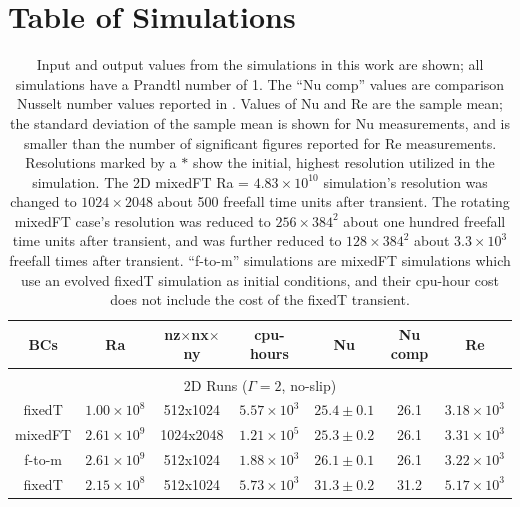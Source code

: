 \documentclass[aps, pre, onecolumn, nofootinbib, notitlepage, groupedaddress, amsfonts, amssymb, amsmath, longbibliography]{revtex4-1}
\begin{document}


\appendix
\section{Table of Simulations}
\label{app:table}


\begin{table}[ht]
\caption{
	Input and output values from the simulations in this work are shown; all simulations have a Prandtl number of 1.
	The ``Nu comp'' values are comparison Nusselt number values reported in \cite{zhu&all2018}.
	Values of Nu and Re are the sample mean; the standard deviation of the sample mean is shown for Nu measurements, and is smaller than the number of significant figures reported for Re measurements.
	Resolutions marked by a $*$ show the initial, highest resolution utilized in the simulation.
	The 2D mixedFT Ra = $4.83 \times 10^{10}$ simulation's resolution was changed to $1024\times2048$ about 500 freefall time units after transient.
	The rotating mixedFT case's resolution was reduced to $256\times384^2$ about one hundred freefall time units after transient, and was further reduced to $128\times384^2$ about $3.3\times 10^3$ freefall times after transient.
	``f-to-m'' simulations are mixedFT simulations which use an evolved fixedT simulation as initial conditions, and their cpu-hour cost does not include the cost of the fixedT transient.
}
\setlength{\tabcolsep}{12pt}
\label{table:speed}
\begin{center}
\begin{tabularx}{\textwidth}{c c c c c c c}
\hline																	
BCs	&	Ra	&	nz$\times$nx$\times$ny	&	cpu-hours &	Nu	&	Nu comp	&	Re \\
\hline \hline \multicolumn{6}{c}{\vspace{-0.2cm}}\\
\multicolumn{7}{c}{\vspace{0.1cm}2D Runs ($\Gamma = 2$, no-slip)} \\
\hline
fixedT	&	$1.00 \times 10^8$		&	512x1024	&	$5.57 \times 10^3$	&	$25.4 \pm 0.1$	&	26.1	&	$3.18 \times 10^3$ \\
mixedFT	&	$2.61 \times 10^9$		&	1024x2048	&	$1.21 \times 10^5$	&	$25.3 \pm 0.2$	&	26.1	&	$3.31 \times 10^3$ \\
f-to-m	&	$2.61 \times 10^9$		&	512x1024	&	$1.88 \times 10^3$	&	$26.1 \pm 0.1$	&	26.1	&	$3.22 \times 10^3$ \\
fixedT	&	$2.15 \times 10^8$		&	512x1024	&	$5.73 \times 10^3$	&	$31.3 \pm 0.2$	&	31.2	&	$5.17 \times 10^3$ \\

\end{tabularx}
\end{center}
\end{table}
\end{document}
